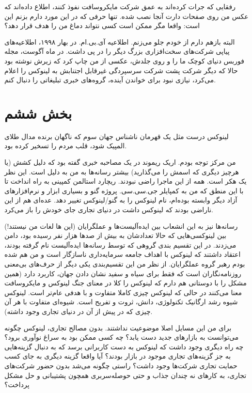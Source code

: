 رفقایی که جرات کرده‌اند به عمق شرکت مایکروسافت نفوذ کنند، اطلاع داده‌اند
که عکس من روی صفحات دارت آنجا نصب شده. تنها حرفی که در این مورد دارم
بزنم این است: واقعا مگر ممکن است کسی نتواند دماغ من را هدف قرار دهد؟

البته بازهم دارم از خودم جلو می‌زنم. اطلاعیه آی.بی.ام. در بهار ۱۹۹۸،
اطلاعیه‌های پیاپی شرکت‌های سخت‌افزاری بزرگ دیگر را در پی داشت. در ماه
آگوست، مجله فوربس
دنیای کوچک ما را  و روی جلدش، عکسی از من چاپ کرد که
زیرش نوشته بود  حالا که دیگر شرکت پشت
شرکت سرسپردگی‌ غیرقابل اجتنابش به لینوکس را اعلام می‌کرد، نیازی نبود
برای خواندن آینده، گروه‌های خبری تبلیغاتی را دنبال کنم.

\section{بخش ششم}
لینوکس درست مثل یک قهرمان ناشناس جهان سوم که ناگهان برنده مدال طلای المپیک شود، قلب مردم را تسخیر کرده بود. 

من مرکز توجه بودم. اریک ریموند در یک مصاحبه خبری گفته بود که دلیل کشش
(یا هرچیز دیگری که اسمش را می‌گذارید) بیشتر رسانه‌ها به من به دلیل
 است. این نظر یک
هکر است. همه از این ماجرا راضی نبودند. ریچارد استالمن کمپینی به راه
انداخت تا با این منطق که من به کمپایلر جی.سی.سی. پروژه گنو و بسیاری
ابزار و نرم‌افزارهای آزاد دیگر وابسته بوده‌ام، نام لینوکس را به
گنو/لینوکس تغییر دهد. عده‌ای هم از این ناراضی بودند که لینوکس داشت در
دنیای تجاری جای خودش را باز می‌کرد.

رسانه‌ها نیز به این انشعاب بین ایده‌آلیست‌ها و عملگرایان (این ها لغات من
نیستند!) بین لینوکسی‌هایی که حالا تعدادشان به بیش از صدها هزار نفر
رسیده بود، دامن می‌زدند. در این تقسیم بندی گروهی که توسط رسانه‌ها
ایده‌آلیست نام گرفته بودند، اعتقاد داشتند که لینوکس با اهداف جامعه
سرمایه‌داری ناسازگار است و من هم شده بودم رهبر گروه عملگرایان. از نظر
من این تقسیم‌بندی یکی دیگر از حرف‌های بی‌معنی روزنامه‌نگاران است که فقط
برای سیاه و سفید نشان دادن جهان، کاربرد دارد (همین مشکل را با دوستانی
هم دارم که لینوکس را کلا در معنای جنگ لینوکس و مایکروسافت معنا می‌کنند
در حالی که لینوکس چیزی کاملا متفاوت و با هدفی عام‌تر است. لینوکس شیوه
رشد ارگانیک تکنولوژی، دانش، ثروت و تفریح است. شیوه‌ای متفاوت با هر آن
چیزی که در پیش از آن در دنیای تجاری وجود داشته).

برای من این مسایل اصلا موضوعیت نداشتند. بدون مصالح تجاری، لینوکس چگونه
می‌توانست به بازارهای جدید دست یابد؟ چه کسی ممکن بود به سراغ نوآوری
برود؟ چه راه دیگری وجود داشت که لینوکس به دست کاربرانی برسد که به
دنبال گزینه‌هایی به جز گزینه‌های تجاری موجود در بازار بودند؟ آیا واقعا
گزینه دیگری به جای کسب حمایت تجاری شرکت‌ها وجود داشت؟ راستی چگونه می‌شد
بدون حضور شرکت‌های تجاری، به کارهای نه چندان جذاب و حتی حوصله‌سربری
همچون پشتیبانی و حل مشکل پرداخت؟

